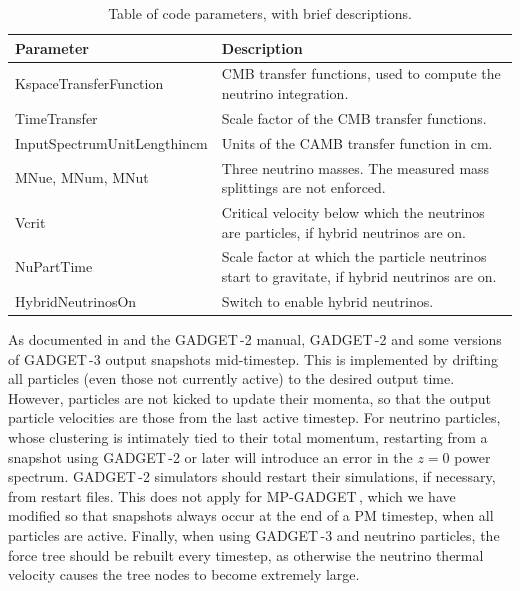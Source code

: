\documentclass[useAMS, usenatbib]{mnras}
\newcommand{\gadget}{{\small GADGET\,}}
\begin{document}
\begin{table}
\begin{center}
\begin{tabular}{|l|l|}
\hline
    Parameter & Description \\
\hline
KspaceTransferFunction   & CMB transfer functions, used to compute the neutrino integration. \\
TimeTransfer             & Scale factor of the CMB transfer functions. \\
InputSpectrumUnitLengthincm   & Units of the CAMB transfer function in cm. \\
MNue, MNum, MNut &  Three neutrino masses. The measured mass splittings are not enforced. \\
Vcrit            & Critical velocity below which the neutrinos are particles, if hybrid neutrinos are on. \\
NuPartTime       & Scale factor at which the particle neutrinos start to gravitate, if hybrid neutrinos are on. \\
HybridNeutrinosOn       & Switch to enable hybrid neutrinos. \\
\hline
\end{tabular}
\end{center}
\caption{Table of code parameters, with brief descriptions.}
\label{tab:parameters}
\end{table}

As documented in \cite{Springel_2005} and the \gadget-2 manual, \gadget-2 and some versions of \gadget-3 output snapshots mid-timestep. This is implemented by drifting all particles (even those not currently active) to the desired output time. However, particles are not kicked to update their momenta, so that the output particle velocities are those from the last active timestep. For neutrino particles, whose clustering is intimately tied to their total momentum, restarting from a snapshot using \gadget-2 or later will introduce an error in the $z=0$ power spectrum. \gadget-2 simulators should restart their simulations, if necessary, from restart files. This does not apply for MP-\gadget, which we have modified so that snapshots always occur at the end of a PM timestep, when all particles are active. Finally, when using \gadget-3 and neutrino particles, the force tree should be rebuilt every timestep, as otherwise the neutrino thermal velocity causes the tree nodes to become extremely large.
\end{document}
